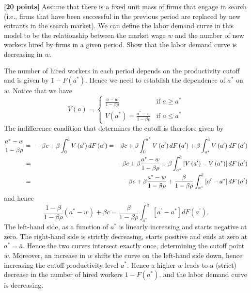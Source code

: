 \documentclass[11pt]{article}
\newenvironment{question}[1][Question]{}{}
\newenvironment{answer}[1][Answer]{}{}
\begin{document}
\begin{question}
\textbf{[20 points]} Assume that there is a fixed unit mass of firms that
engage in search (i.e., firms that have been successful in the previous
period are replaced by new entrants in the search market). We can define the
labor demand curve in this model to be the relationship between the market
wage $w$ and the number of new workers hired by firms in a given period.
Show that the labor demand curve is decreasing in $w$.

\begin{answer}
The number of hired workers in each period depends on the productivity
cutoff and is given by $1-F\left( a^{\ast }\right) $. Hence we need to
establish the dependence of $a^{\ast }$ on $w$. Notice that we have%
\begin{equation*}
V\left( a\right) =\left\{
\begin{array}{cc}
\frac{a-w}{1-\beta \rho } & \text{if }a\geq a^{\ast } \\
V\left( a^{\ast }\right) =\frac{a^{\ast }-w}{1-\beta \rho } & \text{if }%
a\leq a^{\ast }%
\end{array}%
\right.
\end{equation*}%
The indifference condition that determines the cutoff is therefore given by%
\begin{eqnarray*}
\frac{a^{\ast }-w}{1-\beta \rho } &=&-\beta c+\beta \int_{0}^{\bar{a}%
}V\left( a^{\prime }\right) dF\left( a^{\prime }\right) =-\beta c+\beta
\int_{0}^{a^{\ast }}V\left( a^{\prime }\right) dF\left( a^{\prime }\right)
+\beta \int_{a^{\ast }}^{\bar{a}}V\left( a^{\prime }\right) dF\left(
a^{\prime }\right)  \\
&=&-\beta c+\beta \frac{a^{\ast }-w}{1-\beta \rho }+\beta \int_{a^{\ast }}^{%
\bar{a}}\left[ V\left( a^{\prime }\right) -V\left( a^{\ast }\right) \right]
dF\left( a^{\prime }\right)  \\
&=&-\beta c+\beta \frac{a^{\ast }-w}{1-\beta \rho }+\frac{\beta }{1-\beta
\rho }\int_{a^{\ast }}^{\bar{a}}\left[ a^{\prime }-a^{\ast }\right] dF\left(
a^{\prime }\right)
\end{eqnarray*}%
and hence%
\begin{equation*}
\frac{1-\beta }{1-\beta \rho }\left( a^{\ast }-w\right) +\beta c=\frac{\beta
}{1-\beta \rho }\int_{a^{\ast }}^{\bar{a}}\left[ a^{\prime }-a^{\ast }\right]
dF\left( a^{\prime }\right) .
\end{equation*}%
The left-hand side, as a function of $a^{\ast }$ is linearly increasing and
starts negative at zero. The right-hand side is strictly decreasing, starts
positive and ends at zero at $a^{\ast }=\bar{a}$. Hence the two curves
intersect exactly once, determining the cutoff point $\bar{w}$. Moreover, an
increase in $w$ shifts the curve on the left-hand side down, hence
increasing the cutoff productivity level $a^{\ast }$. Hence a higher $w$
leads to a (strict) decrease in the number of hired workers $1-F\left(
a^{\ast }\right) $, and the labor demand curve is decreasing.
\end{answer}
\end{question}
\end{document}
